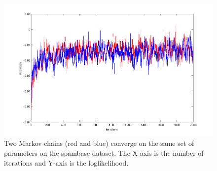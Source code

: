 \begin{figure}[hbt]
\includegraphics[width=1\textwidth]{results/KSsampleChain.png}
\caption{Two Markov chains (red and blue) converge on the same set of
parameters on the spambase dataset. The
X-axis is the number of iterations and Y-axis is the loglikelihood.}
\label{fig:MCMCconverge}
\end{figure}
